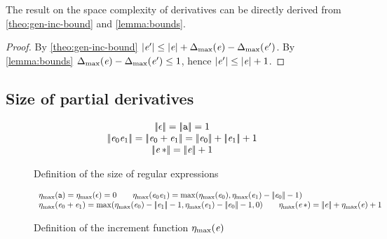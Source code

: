 The result on the space complexity of derivatives can be directly derived from  \cref{theo:gen-inc-bound} and \cref{lemma:bounds}.


\begin{proof}
 By \cref{theo:gen-inc-bound} ${\mid}{\mathit {e}'}{\mid}\leq{\mid}{\ensuremath{\mathit {e}}}{\mid}+{\Delta_{\max}}({\mathit {e}})-{\Delta_{\max}}({\mathit {e}'})$. By \cref{lemma:bounds}
 ${\Delta_{\max}}({\mathit {e}})-{\Delta_{\max}}({\mathit {e}'})\leq 1$, hence
 ${\mid}{\mathit {e}'}{\mid}\leq{\mid}{\ensuremath{\mathit {e}}}{\mid}+1$.
\end{proof}

\subsection{Size of partial derivatives}\label{sec:size}
\begin{figure}
 $$
  \begin{array}{c}
   \tsize{\eps}=\tsize{\sym}=1                                                    \\
   \tsize{\re_0\catop\re_1}=\tsize{\re_0\orop\re_1}=\tsize{\re_0}+\tsize{\re_1}+1 \\
   \tsize{\starop{\re}}=\tsize{\re}+1
  \end{array}
 $$
 \caption{Definition of the size of regular expressions}
 \label{fig:size}
\end{figure}

\begin{figure}
 $$
  \begin{array}{l}
   \incFunSize{\sym}=\incFunSize{\eps}=0                                      \qquad
   \incFunSize{\re_0\catop\re_1}=\max(\incFunSize{\re_0},\incFunSize{\re_1}-\tsize{\re_0}-1) \\
   \incFunSize{\re_0\orop\re_1}= \max(\incFunSize{\re_0}-\tsize{\re_1}-1,\incFunSize{\re_1}-\tsize{\re_0}-1,0)                                        \qquad
   \incFunSize{\starop{\re}}=\tsize{\re}+\incFunSize{\re}+1
  \end{array}
 $$
 \caption{Definition of the increment function ${\eta_{\max}}({\mathit {e}})$}
 \label{fig:incFunSize}
\end{figure}

